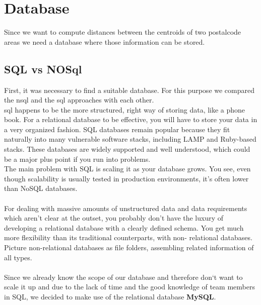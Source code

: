 
\section{Database}

Since we want to compute distances between the centroids of two postalcode areas we need a database where those information can be stored. 
\subsection{SQL vs NOSql}
First, it was necessary to find a suitable database. For this purpose we compared the \ac{nsql} and the \ac{sql} approaches with each other.\\
\acs{sql} happens to be the more structured, right way of storing data, like a phone book. For a relational database to be effective, you will have to store your data in a
very organized fashion. SQL databases remain popular because they fit naturally into many
vulnerable software stacks, including LAMP and Ruby-based stacks. These databases are widely
supported and well understood, which could be a major plus point if you run into problems.\\
The main problem with SQL is scaling it as your database grows. You see, even though
scalability is usually tested in production environments, it’s often lower than NoSQL
databases.\\\\
For dealing with massive amounts of unstructured data and data requirements which
aren’t clear at the outset, you probably don’t have the luxury of developing a relational database with
a clearly defined schema. You get much more flexibility than its traditional counterparts, with non-
relational databases. Picture non-relational databases as file folders, assembling related information
of all types.\\\\
Since we already know the scope of our database and therefore don`t want to scale it up and due to the lack of time and the good knowledge of team members in SQL, we decided to make use of the relational database \textbf{MySQL}.
